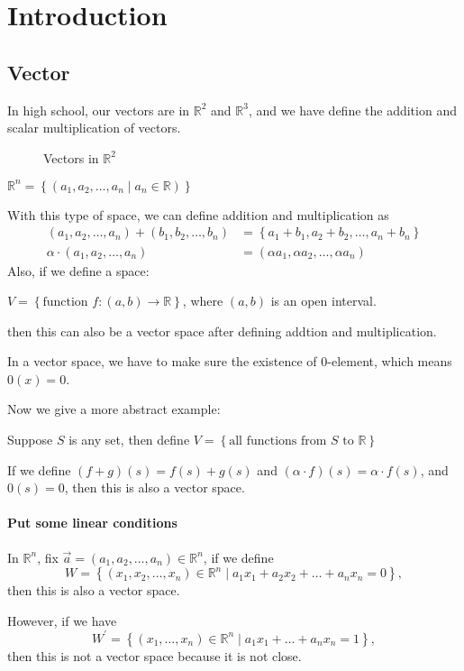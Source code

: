 \chapter{Introduction}
\section{Vector}
In high school, our vectors are in \(\mathbb{R} ^2\) and \(\mathbb{R} ^3\), and we have define the addition and scalar multiplication of vectors.  
\begin{figure}[H]
    \centering
    \caption{Vectors in \(\mathbb{R} ^2\)}
    \label{fig:vec}
\end{figure}
\begin{eg}
    \(\mathbb{R} ^n = \left\{ \left( a_1, a_2, \dots , a_n \mid a_n \in \mathbb{R}  \right)  \right\} \) 
\end{eg}
With this type of space, we can define addition and multiplication as 
\begin{align*}
    \left( a_1, a_2, \dots ,a_n \right) + \left( b_1, b_2, \dots , b_n \right) &= \left\{ a_1 + b_1, a_2 + b_2, \dots , a_n + b_n \right\} \\
    \alpha \cdot \left( a_1, a_2, \dots ,a_n \right) &= \left( \alpha a_1, \alpha a_2, \dots , \alpha a_n \right)  
\end{align*}
Also, if we define a space:
\begin{eg}
    \(V = \left\{ \text{function } f:(a,b) \to \mathbb{R}  \right\} \), where \((a,b)\) is an open interval.  
\end{eg}
then this can also be a vector space after defining addtion and multiplication.
\begin{note}
    In a vector space, we have to make sure the existence of \(0\)-element, which means \(0(x) = 0\). 
\end{note}
Now we give a more abstract example:
\begin{eg}
    Suppose \(S\) is any set, then define \(V = \left\{ \text{all functions from } S \text{ to } \mathbb{R} \right\} \)  
\end{eg}
If we define \((f + g)(s) = f(s) + g(s)\) and \((\alpha \cdot f)(s) = \alpha \cdot f(s)\), and \(0(s) = 0\), then this is also a vector space. 

\subsubsection{Put some linear conditions}
\begin{eg}
    In \(\mathbb{R} ^n\), fix \(\vec{a}=\left( a_1, a_2, \dots , a_n \right) \in \mathbb{R} ^n \), if we define 
\[
    W = \left\{ (x_1, x_2, \dots ,x_n) \in \mathbb{R} ^n \mid a_1 x_1 + a_{2} x_2 + \dots + a_n x_n = 0  \right\}, 
\] then this is also a vector space.
\end{eg}
However, if we have 
\[
    W^{\prime} = \left\{ (x_1, \dots , x_n) \in \mathbb{R} ^n \mid a_1 x_1 + \dots +a_n x_n = 1\right\},
\]
then this is not a vector space because it is not close.

